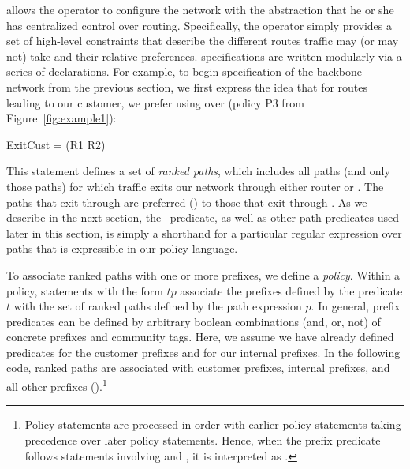 \sysname allows the operator to configure the network with the
abstraction that he or she has centralized control over routing.
Specifically, the operator simply provides a set of high-level constraints
that describe the 
different routes traffic may (or may not) take and their relative preferences.
\sysname specifications are written modularly via a series
of declarations.
For example, to begin specification of the backbone
network from the previous section, we first express the idea that for routes leading to our customer,
we prefer using  over  (policy P3 from Figure~\ref{fig:example1}):
\begin{code}
\Define ExitCust = \Exit(R1 \Prefer R2)
\end{code}
This  statement defines a set of \emph{ranked paths}, which includes
all paths (and only those paths) for which traffic exits our network
through either router  or .  The paths that exit through 
are preferred (\Prefer) to those that exit through .  As we
describe in the next section, the \Exit\ predicate, as well as other
path predicates used later in this section, is simply a shorthand for 
a particular regular expression over paths that is expressible in our policy
language.


To associate ranked paths with
one or more prefixes, we define a \sysname \emph{policy}.
Within a policy, statements with the form $t$\Path$p$
associate the prefixes defined by the predicate $t$ with the set of
ranked paths defined by the path expression $p$.  In general,
prefix predicates can be defined by arbitrary boolean combinations
(and, or, not) of concrete prefixes and community tags.  Here,
we assume we have already defined predicates  for the
customer prefixes and  for our internal prefixes.
In the following code, ranked paths are associated with
customer prefixes, internal prefixes,
and all other prefixes ().\footnote{Policy statements are processed in
order with earlier policy statements taking precedence over later
policy statements.  Hence, when the prefix predicate \True{} follows
statements involving  and , it is interpreted as
.}

